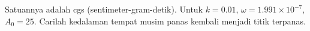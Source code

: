 \begin{exercise}
Satuannya adalah cgs (sentimeter-gram-detik).
Untuk $k=0.01$, $\omega = 1.991 \times {10}^{-7}$, $A_0 = 25$.
Carilah kedalaman tempat musim panas kembali menjadi titik terpanas.
\end{exercise}
